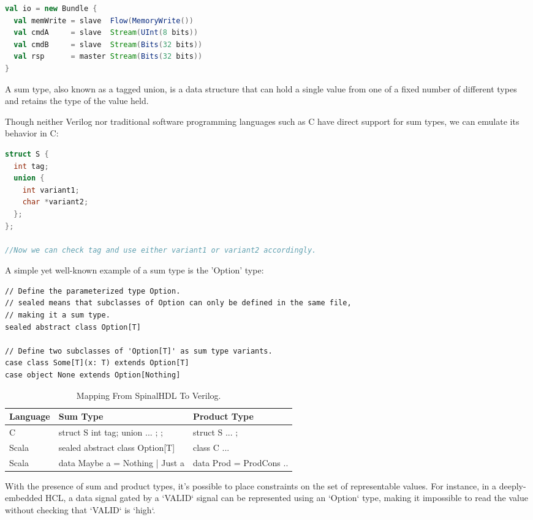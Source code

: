 \documentclass{article}
\begin{document}
\begin{lstlisting}[language=scala]
val io = new Bundle {
  val memWrite = slave  Flow(MemoryWrite())
  val cmdA     = slave  Stream(UInt(8 bits))
  val cmdB     = slave  Stream(Bits(32 bits))
  val rsp      = master Stream(Bits(32 bits))
}
\end{lstlisting}

A sum type, also known as a tagged union, is a data structure that can hold a single value from one of a fixed number of different types and retains the type of the value held.

Though neither Verilog nor traditional software programming languages such as C have direct support for sum types, we can emulate its behavior in C:

\begin{lstlisting}[language=C]
struct S {
  int tag;
  union {
    int variant1;
    char *variant2;
  };
};

//Now we can check tag and use either variant1 or variant2 accordingly.
\end{lstlisting}

A simple yet well-known example of a sum type is the 'Option' type:

\begin{lstlisting}
// Define the parameterized type Option.
// sealed means that subclasses of Option can only be defined in the same file,
// making it a sum type.
sealed abstract class Option[T]

// Define two subclasses of 'Option[T]' as sum type variants.
case class Some[T](x: T) extends Option[T]
case object None extends Option[Nothing]
\end{lstlisting}

\begin{table}[hbt]
\centering
\begin{tabular}{l|l|l}
Language & Sum Type & Product Type\\\hline
C        & struct S { int tag; union { ... }; }; & struct S { ... };\\
Scala    & sealed abstract class Option[T]       & class C { ... } \\
Scala    & data Maybe a = Nothing | Just a       & data Prod = ProdCons { .. }
\end{tabular}
\caption{\label{tab:widgets}Mapping From SpinalHDL To Verilog.}
\end{table}

With the presence of sum and product types, it’s possible to place constraints on the set of representable values. For instance, in a deeply-embedded HCL, a data signal gated by a `VALID` signal can be represented using an `Option` type, making it impossible to read the value without checking that `VALID` is `high`.
\end{document}
